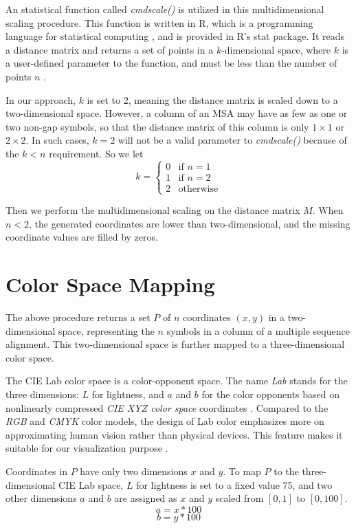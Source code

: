 An statistical function called \emph{cmdscale()} \cite{R2009aa} is utilized in this multidimensional scaling procedure. This function is written in R, which is a programming language for statistical computing \cite{Gentleman:aa}, and is provided in R’s stat package. It reads a distance matrix and returns a set of points in a $k$-dimensional space, where $k$ is a user-defined parameter to the function, and must be less than the number of points $n$ \cite{Cailliez:1983aa,Cox:2008aa}.

In our approach, $k$ is set to 2, meaning the distance matrix is scaled down to a two-dimensional space. However, a column of an MSA may have as few as one or two non-gap symbols, so that the distance matrix of this column is only $1 \times 1$ or $2 \times 2$. In such cases, $k=2$ will not be a valid parameter to \emph{cmdscale()} because of the $k<n$ requirement. So we let
\[
k = \left\{ \begin{array}{ll}
0 & \mbox{if $n=1$} \\
1 & \mbox{if $n=2$} \\
2 & \mbox{otherwise}
\end{array}
\right.
\]

Then we perform the multidimensional scaling on the distance matrix $M$. When $n<2$, the generated coordinates are lower than two-dimensional, and the missing coordinate values are filled by zeros.

\section{Color Space Mapping}

The above procedure returns a set $P$ of $n$ coordinates $(x,y)$ in a two-dimensional space, representing the $n$ symbols in a column of a multiple sequence alignment. This two-dimensional space is further mapped to a three-dimensional color space.

The CIE Lab color space \cite {McLAREN:1976aa} is a color-opponent space. The name \emph{Lab} stands for the three dimensions: $L$ for lightness, and $a$ and $b$ for the color opponents based on nonlinearly compressed \emph{CIE XYZ color space} coordinates \cite{CIE:1932aa,Smith:1931aa}. Compared to the \emph{RGB} and \emph{CMYK} color models, the design of Lab color emphasizes more on approximating human vision rather than physical devices. This feature makes it suitable for our visualization purpose \cite{Margulis:2005aa}.

Coordinates in $P$ have only two dimensions $x$ and $y$. To map $P$ to the three-dimensional CIE Lab space, $L$ for lightness is set to a fixed value 75, and two other dimensions $a$ and $b$ are assigned as $x$ and $y$ scaled from $[0,1]$ to $[0, 100]$. $$a=x*100$$ $$b=y*100$$

